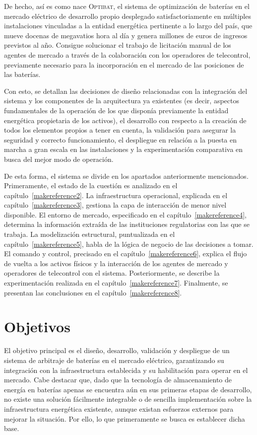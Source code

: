 De hecho, así es como nace \textsc{Optibat}, el sistema de optimización de baterías en el mercado eléctrico de desarrollo propio desplegado satisfactoriamente en múltiples instalaciones vinculadas a la entidad energética pertinente a lo largo del país, que mueve docenas de megavatios hora al día y genera millones de euros de ingresos previstos al año. Consigue solucionar el trabajo de licitación manual de los agentes de mercado a través de la colaboración con los operadores de telecontrol, previamente necesario para la incorporación en el mercado de las posiciones de las baterías.

Con esto, se detallan las decisiones de diseño relacionadas con la integración del sistema y los componentes de la arquitectura ya existentes (es decir, aspectos fundamentales de la operación de los que disponía previamente la entidad energética propietaria de los activos), el desarrollo con respecto a la creación de todos los elementos propios a tener en cuenta, la validación para asegurar la seguridad y correcto funcionamiento, el despliegue en relación a la puesta en marcha a gran escala en las instalaciones y la experimentación comparativa en busca del mejor modo de operación.

De esta forma, el sistema se divide en los apartados anteriormente mencionados. Primeramente, el estado de la cuestión es analizado en el capítulo~\ref{makereference2}. La infraestructura operacional, explicada en el capítulo~\ref{makereference3}, gestiona la capa de interacción de menor nivel disponible. El entorno de mercado, especificado en el capítulo~\ref{makereference4}, determina la información extraída de las instituciones regulatorias con las que se trabaja. La modelización estructural, puntualizada en el capítulo~\ref{makereference5}, habla de la lógica de negocio de las decisiones a tomar. El comando y control, precisado en el capítulo~\ref{makereference6}, explica el flujo de vuelta a los activos físicos y la interacción de los agentes de mercado y operadores de telecontrol con el sistema. Posteriormente, se describe la experimentación realizada en el capítulo~\ref{makereference7}. Finalmente, se presentan las conclusiones en el capítulo~\ref{makereference8}.

\section{Objetivos}%
\label{makereference1.1}

El objetivo principal es el diseño, desarrollo, validación y despliegue de un sistema de arbitraje de baterías en el mercado eléctrico, garantizando su integración con la infraestructura establecida y su habilitación para operar en el mercado. Cabe destacar que, dado que la tecnología de almacenamiento de energía en baterías apenas se encuentra aún en sus primeras etapas de desarrollo, no existe una solución fácilmente integrable o de sencilla implementación sobre la infraestructura energética existente, aunque existan esfuerzos externos para mejorar la situación. Por ello, lo que primeramente se busca es establecer dicha base.

